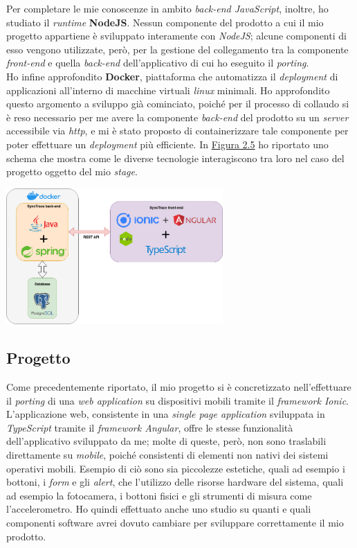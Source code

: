 Per completare le mie conoscenze in ambito \textit{back-end JavaScript}, inoltre, ho studiato il \textit{runtime} \textbf{NodeJS}. Nessun componente del prodotto a cui il mio progetto appartiene è sviluppato interamente con \textit{NodeJS}; alcune componenti di esso vengono utilizzate, però, per la gestione del collegamento tra la componente \textit{front-end} e quella \textit{back-end} dell'applicativo di cui ho eseguito il \textit{porting}. \\
Ho infine approfondito \textbf{Docker}, piattaforma che automatizza il \textit{deployment} di applicazioni all'interno di macchine virtuali \textit{linux} minimali. Ho approfondito questo argomento a sviluppo già cominciato, poiché per il processo di collaudo si è reso necessario per me avere la componente \textit{back-end} del prodotto su un \textit{server} accessibile via \textit{http}, e mi è stato proposto di containerizzare tale componente per poter effettuare un \textit{deployment} più efficiente. In \hyperref[img:tecnologie]{Figura 2.5} ho riportato uno schema che mostra come le diverse tecnologie interagiscono tra loro nel caso del progetto oggetto del mio \textit{stage}. \\

\begin{minipage}{\linewidth}
  \label{img:tecnologie}
  \centering
    \includegraphics[height=5.2cm]{immagini/tecnologie}
\end{minipage}

\subsection{Progetto}

Come precedentemente riportato, il mio progetto si è concretizzato nell'effettuare il \textit{porting} di una \textit{web application} su dispositivi mobili tramite il \textit{framework Ionic}. L'applicazione web, consistente in una \textit{single page application} sviluppata in \textit{TypeScript} tramite il \textit{framework Angular}, offre le stesse funzionalità dell'applicativo sviluppato da me; molte di queste, però, non sono traslabili direttamente su \textit{mobile}, poiché consistenti di elementi non nativi dei sistemi operativi mobili. Esempio di ciò sono sia piccolezze estetiche, quali ad esempio i bottoni, i \textit{form} e gli \textit{alert}, che l'utilizzo delle risorse hardware del sistema, quali ad esempio la fotocamera, i bottoni fisici e gli strumenti di misura come l'accelerometro. Ho quindi effettuato anche uno studio su quanti e quali componenti software avrei dovuto cambiare per sviluppare correttamente il mio prodotto.


